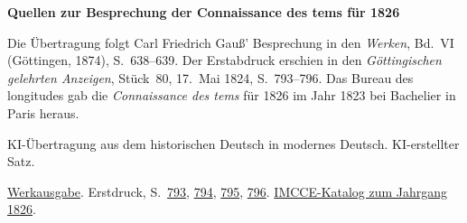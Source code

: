 \clearpage\thispagestyle{empty}
\begin{center}\Large\bfseries Quellen zur Besprechung der Connaissance des tems für 1826\end{center}

Die Übertragung folgt Carl Friedrich Gauß’ Besprechung in den \emph{Werken}, Bd.~VI (Göttingen, 1874), S.~638--639. Der Erstabdruck erschien in den \emph{Göttingischen gelehrten Anzeigen}, Stück~80, 17.~Mai 1824, S.~793--796. Das Bureau des longitudes gab die \emph{Connaissance des tems} für 1826 im Jahr 1823 bei Bachelier in Paris heraus.

KI-Übertragung aus dem historischen Deutsch in modernes Deutsch. KI-erstellter Satz.

\href{https://gdz.sub.uni-goettingen.de/id/PPN236007467}{Werkausgabe}. Erstdruck, S.~\href{https://images.p.sub.uni-goettingen.de/iiif/image/gdz:PPN385030444_1824_2:00000107/full/1650,/0/default.jpg}{793}, \href{https://images.p.sub.uni-goettingen.de/iiif/image/gdz:PPN385030444_1824_2:00000108/full/1650,/0/default.jpg}{794}, \href{https://images.p.sub.uni-goettingen.de/iiif/image/gdz:PPN385030444_1824_2:00000109/full/1650,/0/default.jpg}{795}, \href{https://images.p.sub.uni-goettingen.de/iiif/image/gdz:PPN385030444_1824_2:00000110/full/1650,/0/default.jpg}{796}. \href{https://cdt.imcce.fr/items/show/175}{IMCCE-Katalog zum Jahrgang 1826}.

\clearpage
